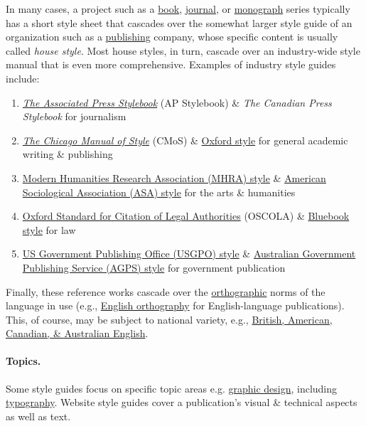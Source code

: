 \documentclass{article}
\begin{document}
In many cases, a project such as a \href{https://en.wikipedia.org/wiki/Book}{book}, \href{https://en.wikipedia.org/wiki/Academic_journal}{journal}, or \href{https://en.wikipedia.org/wiki/Monograph}{monograph} series typically has a short style sheet that cascades over the somewhat larger style guide of an organization such as a \href{https://en.wikipedia.org/wiki/Publishing}{publishing} company, whose specific content is usually called {\it house style}. Most house styles, in turn, cascade over an industry-wide style manual that is even more comprehensive. Examples of industry style guides include:
\begin{enumerate}
	\item \href{https://en.wikipedia.org/wiki/The_Associated_Press_Stylebook}{\it The Associated Press Stylebook} (AP Stylebook) \& {\it The Canadian Press Stylebook} for journalism
	\item \href{https://en.wikipedia.org/wiki/The_Chicago_Manual_of_Style}{\it The Chicago Manual of Style} (CMoS) \& \href{https://en.wikipedia.org/wiki/Hart%27s_Rules}{Oxford style} for general academic writing \& publishing
	\item \href{https://en.wikipedia.org/wiki/MHRA_Style_Guide}{Modern Humanities Research Association (MHRA) style} \& \href{https://en.wikipedia.org/wiki/ASA_style}{American Sociological Association (ASA) style} for the arts \& humanities
	\item \href{https://en.wikipedia.org/wiki/Oxford_Standard_for_Citation_of_Legal_Authorities}{Oxford Standard for Citation of Legal Authorities} (OSCOLA) \& \href{https://en.wikipedia.org/wiki/Bluebook}{Bluebook style} for law
	\item \href{https://en.wikipedia.org/wiki/GPO_style_manual}{US Government Publishing Office (USGPO) style} \& \href{https://en.wikipedia.org/wiki/Australian_Government_Publishing_Service}{Australian Government Publishing Service (AGPS) style} for government publication
\end{enumerate}
Finally, these reference works cascade over the \href{https://en.wikipedia.org/wiki/Orthography}{orthographic} norms of the language in use (e.g., \href{https://en.wikipedia.org/wiki/English_orthography}{English orthography} for English-language publications). This, of course, may be subject to national variety, e.g., \href{https://en.wikipedia.org/wiki/Comparison_of_American_and_British_English}{British, American, Canadian, \& Australian English}.

\paragraph{Topics.} Some style guides focus on specific topic areas e.g. \href{https://en.wikipedia.org/wiki/Graphic_design}{graphic design}, including \href{https://en.wikipedia.org/wiki/Typography}{typography}. Website style guides cover a publication's visual \& technical aspects as well as text.
\end{document}
